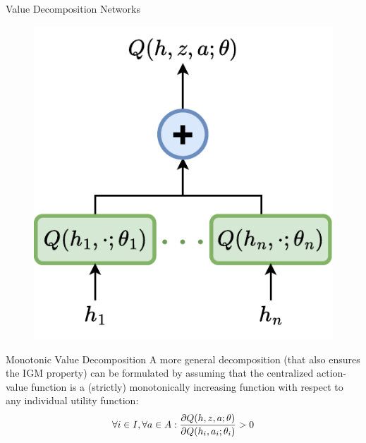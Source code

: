 \begin{frame}[t]{Value Decomposition Networks}
\begin{minipage}{0.3\textwidth}
\begin{figure}
            \includegraphics[width=\textwidth]{images/chapter_9/vdn_architecture.pdf}
        \end{figure}
    \end{minipage}
\end{frame}

\begin{frame}[t]{Monotonic Value Decomposition}
    A more general decomposition (that also ensures the IGM property) can be formulated by assuming that the centralized action-value function is a (strictly) monotonically increasing function with respect to any individual utility function:
    \begin{equation*}
        \forall i\in I, \forall a \in A: \frac{\partial Q(h, z, a; \theta)}{\partial Q(h_i, a_i; \theta_i)} > 0
    \end{equation*}

\end{frame}

